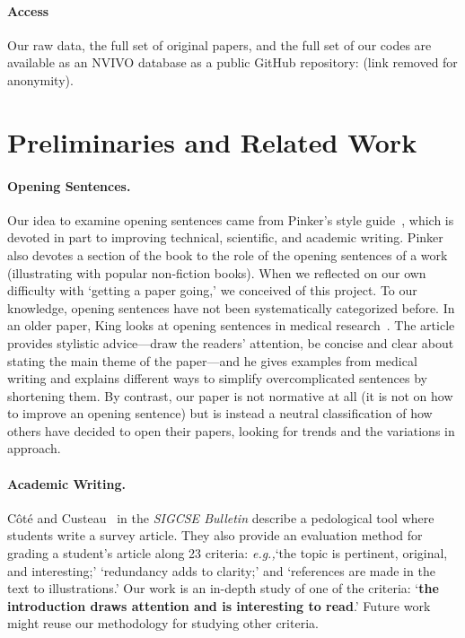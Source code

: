 \documentclass[sigconf,anonymous]{acmart}
\newcommand{\eg}{\textit{e.g.,}\xspace}
\begin{document}
	\paragraph{Access} Our raw data, the full set of original papers, and the full set of our codes are available as an NVIVO database as a public GitHub repository: (link removed for anonymity).

\section{Preliminaries and Related Work}

\paragraph{Opening Sentences.}

Our idea to examine opening sentences came from Pinker's style guide~\cite{Pin15}, which is devoted in part to improving technical, scientific, and academic writing. Pinker also devotes a section of the book to the role of the opening sentences of a work (illustrating with popular non-fiction books). When we reflected on our own difficulty with `getting a paper going,' we conceived of this project. To our knowledge, opening sentences have not been systematically categorized before. In an older paper, King looks at opening sentences in medical research~\cite{king1967opening}. The article provides stylistic advice---draw the readers' attention, be concise and clear about stating the main theme of the paper---and he gives examples from medical writing and explains different ways to simplify overcomplicated sentences by shortening them. By contrast, our paper is not normative at all (it is not on how to improve an opening sentence) but is instead a neutral classification of how others have decided to open their papers, looking for trends and the variations in approach.

\paragraph{Academic Writing.}  Côté and Custeau~\cite{CC92} in the \textit{SIGCSE Bulletin} describe a pedological tool where students write a survey article. They also provide an evaluation method for grading a student's article along 23 criteria: \eg `the topic is pertinent, original, and interesting;' `redundancy adds to clarity;' and `references are made in the text to illustrations.' Our work is an in-depth study of one of the criteria: `\textbf{the introduction draws attention and is interesting to read}.' Future work might reuse our methodology for studying other criteria.
\end{document}
